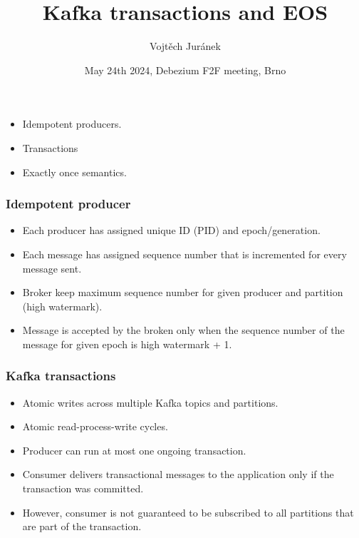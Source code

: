 \documentclass[10pt,utf8]{beamer}
\title{Kafka transactions and EOS}
\author{Vojtěch Juránek}
\institute[Red Hat]{Red Hat}
\date{May 24th 2024, Debezium F2F meeting, Brno}
\begin{document}


\begin{frame}
    \titlepage
\end{frame}

\begin{frame}
    \begin{itemize}
        \item Idempotent producers.
        \item Transactions 
        \item Exactly once semantics.
    \end{itemize}
\end{frame}

\begin{frame}
    \frametitle{Idempotent producer}
    \begin{itemize}
        \item Each producer has assigned unique ID (PID) and epoch/generation.
        \item Each message has assigned sequence number that is incremented for every message sent.
        \item Broker keep maximum sequence number for given producer and partition (high watermark).
        \item Message is accepted by the broken only when the sequence number of the message for given epoch is high watermark + 1.
    \end{itemize}
\end{frame}

\begin{frame}
    \frametitle{Kafka transactions}
    \begin{itemize}
        \item Atomic writes across multiple Kafka topics and partitions.
        \item Atomic read-process-write cycles.
        \item Producer can run at most one ongoing transaction.
        \item Consumer delivers transactional messages to the application only if the transaction was committed.
        \item However, consumer is not guaranteed to be subscribed to all partitions that are part of the transaction.
    \end{itemize}
\end{frame}
\end{document}
